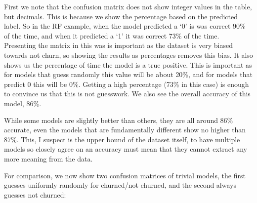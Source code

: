 \documentclass[]{article}
\newcommand{\winningaccuracy}{86\%\xspace}
\newcommand{\winningtpaccuracy}{90\%\xspace}
\newcommand{\winningmodelshort}{RF\xspace}
\newcommand{\winningtnrate}{73\%\xspace}
\begin{document}
First we note that the confusion matrix does not show integer values in the table, but decimals. This is because we show the percentage based on the predicted label. So in the \winningmodelshort example, when the model predicted a ‘0’ is was correct \winningtpaccuracy of the time, and when it predicted a ‘1’ it was correct \winningtnrate of the time. Presenting the matrix in this was is important as the dataset is very biased towards not churn, so showing the results as percentages removes this bias. It also shows us the percentage of time the model is a true positive. This is important as for models that guess randomly this value will be about 20\%, and for models that predict 0 this will be 0\%. Getting a high percentage (\winningtnrate in this case) is enough to convince us that this is not guesswork. We also see the overall accuracy of this model, \winningaccuracy. 

While some models are slightly better than others, they are all around 86\% accurate, even the models that are fundamentally different show no higher than 87\%. This, I suspect is the upper bound of the dataset itself, to have multiple models so closely agree on an accuracy must mean that they cannot extract any more meaning from the data.

For comparison, we now show two confusion matrices of trivial models, the first guesses uniformly randomly for churned/not churned, and the second always guesses not churned:
\end{document}
